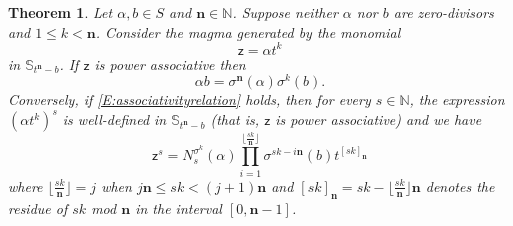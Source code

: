 \documentclass[10pt,a4paper]{amsart}
\newtheorem{theorem}{Theorem}
\newcommand{\N}{\mathbb{N}}
\newcommand{\de}{\mathbf{n}}  %
\newcommand{\ring}{S}
\newcommand{\scz}{\mathsf{z}}  %
\begin{document}
\begin{theorem}\label{T:powerassociative}
    Let $\alpha, b\in \ring$ and ${\de}\in \N$.  Suppose neither $\alpha$ nor $b$ are zero-divisors and $1\leq k <{\de}$.  Consider the magma generated by the monomial
    $$
    \scz=\alpha t^k
    $$
    in $\mathbb{S}_{t^\de-b}$. 
    If $\scz$ is power associative then
\begin{equation}\label{E:associativityrelation}
    \alpha b = \sigma^{\de}(\alpha)\sigma^k(b).
    \end{equation}
    Conversely, if \eqref{E:associativityrelation} holds, then  for every $s\in \mathbb{N}$, the expression $(\alpha t^k)^s$ is well-defined in $\mathbb{S}_{t^\de-b}$ 
    (that is, $\scz$ is power associative) and we have
    \begin{equation}\label{G(t)^s}
    \scz^s = N_{s}^{\sigma^k}(\alpha)\prod_{i=1}^{\lfloor \frac{sk}{{\de}}\rfloor} \sigma^{sk-i{\de}}(b)t^{[sk]_{\de}}
    \end{equation}
    where $\lfloor \frac{sk}{\de}\rfloor=j$ when $j{\de}\leq sk<(j+1){\de}$ and $[sk]_{\de} = sk-\lfloor \frac{sk}{\de}\rfloor \de$ denotes the residue of $sk$ mod $\de$ in the interval $[0,\de-1]$.
\end{theorem}
\end{document}
